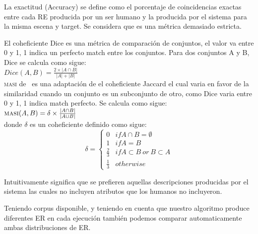 La exactitud (Accuracy) se define como el porcentaje de coincidencias exactas entre cada RE producida por un ser humano y la producida por el sistema para la misma escena y target. Se considera que es una m\'etrica demasiado estricta.

El coheficiente Dice es una m\'etrica de comparaci\'on de conjuntos, el valor va entre 0 y 1, 1 indica un perfecto match entre los conjuntos. Para dos conjuntos A y B, Dice se calcula como sigue:\\

$Dice(A,B) = \frac{2\times|A \cap B|}{|A|+|B|}$\\

\textsc{masi} de \cite{Passonneau06measuringagreement}~es una adaptaci\'on de el coheficiente Jaccard el cual varia en favor de la similaridad cuando un conjunto es un subconjunto de otro, como Dice varia entre 0 y 1, 1 indica match perfecto. Se calcula como sigue:\\

$\textsc{masi}(A,B) = \delta \times \frac{|A \cap B|}{|A \cup B|}$ \\


donde $\delta$ es un coheficiente definido como sigue:\\


 \begin{equation}
     \delta  = \left\{
	       \begin{array}{ll}
		 0      & if A \cap B = \emptyset \\
		 1 & if A = B  \\
		 \frac{2}{3}     & if A \subset B ~or~ B \subset A\\
		 \frac{1}{3}     & otherwise
	       \end{array}
	     \right.
 \end{equation}

Intuitivamente significa que se prefieren aquellas descripciones producidas por el sistema las cuales no incluyen atributos que los humanos no incluyeron.

Teniendo corpus disponible, y teniendo en cuenta que nuestro algoritmo produce diferentes ER en cada ejecuci\'on tambi\'en podemos comparar automaticamente ambas distribuciones de ER.


